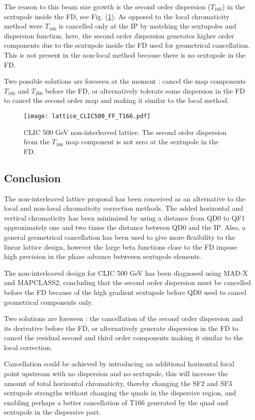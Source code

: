 The reason to this beam size growth is the second order dispersion ($T_{166}$) in the sextupole inside the FD, see Fig. (\ref{f-latticeT166}). As opposed to the local chromaticity method were $T_{166}$ is cancelled only at the IP by matching the sextupoles and dispersion function, here, the second order dispersion generates higher order components due to the sextupole inside the FD used for geometrical cancellation. This is not present in the non-local method because there is no sextupole in the FD.\par
Two possible solutions are foreseen at the moment : cancel the map components $T_{166}$ and $T_{266}$ before the FD, or alternatively tolerate some dispersion in the FD to cancel the second order map and making it similar to the local method.\par
\begin{figure}[!htb]
   \centering
   \hspace*{-0.6cm}
   \texttt{[image: lattice\_CLIC500\_FF\_T166.pdf]}
   \caption{CLIC 500 GeV non-interleaved lattice. The second order dispersion from the $T_{166}$ map component is not zero at the sextupole in the FD.}
   \label{f-latticeT166}
\end{figure}
 
 \subsection{Conclusion}
The non-interleaved lattice proposal has been conceived as an alternative to the local and non-local chromaticity correction methods. The added horizontal and vertical chromaticity has been minimized by using a distance from QD0 to QF1 approximately one and two times the distance between QD0 and the IP. Also, a general geometrical cancellation has been used to give more flexibility to the linear lattice design, however the large beta functions close to the FD impose high precision in the phase advance betweeen sextupole elements.\par
The non-interleaved design for CLIC 500 GeV has been diagnosed using MAD-X and MAPCLASS2, concluding that the second order dispersion must be cancelled before the FD because of the high gradient sextupole before QD0 used to cancel geometrical components only.\par
Two solutions are foreseen : the cancellation of the second order dispersion and its derivative before the FD, or alternatively generate dispersion in the FD to cancel the residual second and third order components making it similar to the local correction.\par
Cancellation could be achieved by introducing an additional horizontal focal point upstream with no dispersion and no sextupole, this will increase the amount of total horizontal chromaticity, thereby changing the SF2 and SF3 sextupole strengths without changing the quads in the dispersive region, and enabling perhaps a better cancellation of T166 generated by the quad and sextupole in the dispersive part.%
